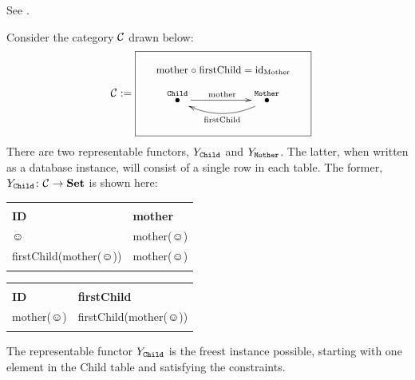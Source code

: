 \documentclass[CT4S-EN-RU]{subfiles}
\begin{document}
\begin{lemmaRUS}\label{lemma:Yoneda}
\end{lemmaRUS}

\begin{proofENG}
See \cite{Mac}.
\end{proofENG}

\begin{proofRUS}
\end{proofRUS}

\begin{exampleENG}\label{ex:yoneda}
Consider the category $\mathcal{C}$ drawn below:
$$
\mcC:=\parbox{2.1in}{\fbox{\parbox{2.1in}{\begin{center}\small mother\;$\circ$\;firstChild\;=\;$\id_{\tn{Mother}}$\normalsize\end{center}$$\xymatrix{\LTO{Child}\ar[rr]^{\tn{mother}}&&\LTO{Mother}\ar@/^1pc/[ll]^{\tn{firstChild}}}$$}}}
$$
There are two representable functors, $Y_{\tt Child}$ and $Y_{\tt Mother}$. The latter, when written as a database instance, will consist of a single row in each table. The former, $Y_{\tt Child}\colon\mathcal{C}\rightarrow{\bf Set}$ is shown here:
\begin{center}
\begin{tabular}{| l || l |}\bhline
\multicolumn{2}{|c|}{Child}\\\bhline
{\bf ID}&{\bf mother}\\\hline
$\smiley$&mother($\smiley$)\\\hline
firstChild(mother($\smiley$))&mother($\smiley$)\\\bbhline
\end{tabular}
\hsp
\begin{tabular}{| l || l |}\bhline
\multicolumn{2}{|c|}{Mother}\\\bhline
{\bf ID}&{\bf firstChild}\\\bbhline
mother($\smiley$)&firstChild(mother($\smiley$))\\\bhline
\end{tabular}
\end{center}
The representable functor $Y_{\tt Child}$ is the freest instance possible, starting with one element in the Child table and satisfying the constraints. 


\end{exampleENG}
\end{document}
